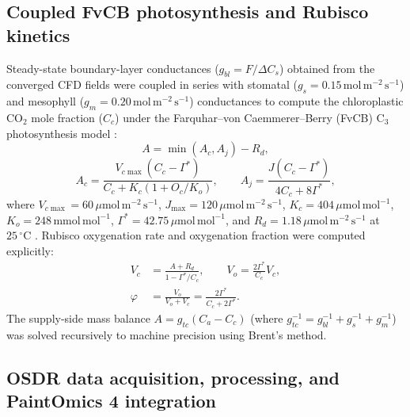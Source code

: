 \documentclass[10pt,twocolumn,a4paper]{article}
\newcommand{\ums}{\ensuremath{\mu\mathrm{mol\,m^{-2}\,s^{-1}}}}
\newcommand{\molms}{\ensuremath{\mathrm{mol\,m^{-2}\,s^{-1}}}}
\begin{document}
\subsection*{Coupled FvCB photosynthesis and Rubisco kinetics}

Steady-state boundary-layer conductances ($g_{bl} = F/\Delta C_s$) obtained from the converged CFD fields were coupled in series with stomatal ($g_s = 0.15\,\molms$) and mesophyll ($g_m = 0.20\,\molms$) conductances to compute the chloroplastic $\mathrm{CO_2}$ mole fraction ($C_c$) under the Farquhar--von Caemmerer--Berry (FvCB) $\mathrm{C_3}$ photosynthesis model \citep{farquhar1980}:
\begin{equation}
A = \min(A_c, A_j) - R_d ,
\end{equation}
\begin{equation}
A_c = \frac{V_{c\max}(C_c - \Gamma^*)}{C_c + K_c(1 + O_c/K_o)}, \qquad A_j = \frac{J(C_c - \Gamma^*)}{4C_c + 8\Gamma^*} ,
\end{equation}
where $V_{c\max} = 60\,\ums$, $J_{\max} = 120\,\ums$, $K_c = 404\,\mu\mathrm{mol\,mol^{-1}}$, $K_o = 248\,\mathrm{mmol\,mol^{-1}}$, $\Gamma^* = 42.75\,\mu\mathrm{mol\,mol^{-1}}$, and $R_d = 1.18\,\ums$ at $25\,^\circ\mathrm{C}$ \citep{bernacchi2001,bernacchi2003}. Rubisco oxygenation rate and oxygenation fraction were computed explicitly:
\begin{align}
V_c &= \frac{A + R_d}{1 - \Gamma^*/C_c}, \qquad V_o = \frac{2\Gamma^*}{C_c}V_c, \\
\varphi &= \frac{V_o}{V_o + V_c} = \frac{2\Gamma^*}{C_c + 2\Gamma^*} .
\end{align}
The supply-side mass balance $A = g_{tc}(C_a - C_c)$ (where $g_{tc}^{-1} = g_{bl}^{-1} + g_s^{-1} + g_m^{-1}$) was solved recursively to machine precision using Brent's method.

\subsection*{OSDR data acquisition, processing, and PaintOmics 4 integration}
\end{document}
